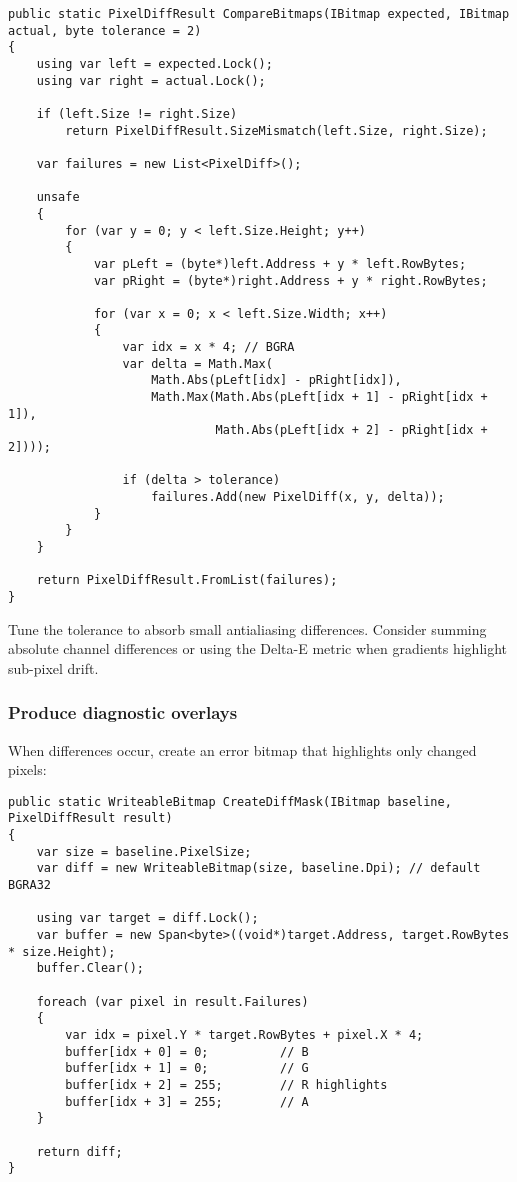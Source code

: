 \begin{lstlisting}
public static PixelDiffResult CompareBitmaps(IBitmap expected, IBitmap actual, byte tolerance = 2)
{
    using var left = expected.Lock();
    using var right = actual.Lock();

    if (left.Size != right.Size)
        return PixelDiffResult.SizeMismatch(left.Size, right.Size);

    var failures = new List<PixelDiff>();

    unsafe
    {
        for (var y = 0; y < left.Size.Height; y++)
        {
            var pLeft = (byte*)left.Address + y * left.RowBytes;
            var pRight = (byte*)right.Address + y * right.RowBytes;

            for (var x = 0; x < left.Size.Width; x++)
            {
                var idx = x * 4; // BGRA
                var delta = Math.Max(
                    Math.Abs(pLeft[idx] - pRight[idx]),
                    Math.Max(Math.Abs(pLeft[idx + 1] - pRight[idx + 1]),
                             Math.Abs(pLeft[idx + 2] - pRight[idx + 2])));

                if (delta > tolerance)
                    failures.Add(new PixelDiff(x, y, delta));
            }
        }
    }

    return PixelDiffResult.FromList(failures);
}
\end{lstlisting}

Tune the tolerance to absorb small antialiasing differences. Consider
summing absolute channel differences or using the Delta-E metric when
gradients highlight sub-pixel drift.

\subsubsection{Produce diagnostic
overlays}\label{produce-diagnostic-overlays}

When differences occur, create an error bitmap that highlights only
changed pixels:

\begin{lstlisting}
public static WriteableBitmap CreateDiffMask(IBitmap baseline, PixelDiffResult result)
{
    var size = baseline.PixelSize;
    var diff = new WriteableBitmap(size, baseline.Dpi); // default BGRA32

    using var target = diff.Lock();
    var buffer = new Span<byte>((void*)target.Address, target.RowBytes * size.Height);
    buffer.Clear();

    foreach (var pixel in result.Failures)
    {
        var idx = pixel.Y * target.RowBytes + pixel.X * 4;
        buffer[idx + 0] = 0;          // B
        buffer[idx + 1] = 0;          // G
        buffer[idx + 2] = 255;        // R highlights
        buffer[idx + 3] = 255;        // A
    }

    return diff;
}
\end{lstlisting}

